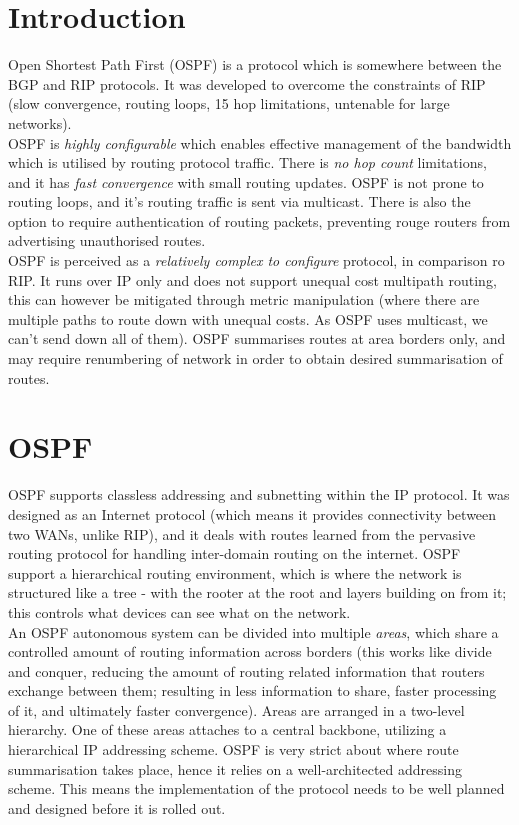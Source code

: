 
\section{Introduction}

Open Shortest Path First (OSPF) is a protocol which is somewhere between the BGP and RIP protocols. It was developed to overcome the constraints of RIP (slow convergence, routing loops, 15 hop limitations, untenable for large networks).\\

OSPF is \textit{highly configurable} which enables effective management of the bandwidth which is utilised by routing protocol traffic. There is \textit{no hop count} limitations, and it has \textit{fast convergence} with small routing updates. OSPF is not prone to routing loops, and it's routing traffic is sent via multicast. There is also the option to require authentication of routing packets, preventing rouge routers from advertising unauthorised routes.\\

OSPF is perceived as a \textit{relatively complex to configure} protocol, in comparison ro RIP. It runs over IP only and does not support unequal cost multipath routing, this can however be mitigated through metric manipulation (where there are multiple paths to route down with unequal costs. As OSPF uses multicast, we can't send down all of them). OSPF summarises routes at area borders only, and may require renumbering of network in order to obtain desired summarisation of routes.

\section{OSPF}
OSPF supports classless addressing and subnetting within the IP protocol. It was designed as an Internet protocol (which means it provides connectivity between two WANs, unlike RIP), and it deals with routes learned from the pervasive routing protocol for handling inter-domain routing on the internet. OSPF support a hierarchical routing environment, which is where the network is structured like a tree - with the rooter at the root and layers building on from it; this controls what devices can see what on the network.\\

An OSPF autonomous system can be divided into multiple \textit{areas}, which share a controlled amount of routing information across borders (this works like divide and conquer, reducing the amount of routing related information that routers exchange between them; resulting in less information to share, faster processing of it, and ultimately faster convergence). Areas are arranged in a two-level hierarchy. One of these areas attaches to a central backbone, utilizing a hierarchical IP addressing scheme. OSPF is very strict about where route summarisation takes place, hence it relies on a well-architected addressing scheme. This means the implementation of the protocol needs to be well planned and designed before it is rolled out.\\


